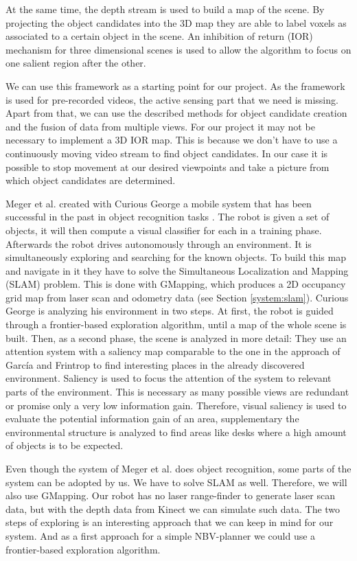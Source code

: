 \documentclass[a4paper,11pt,english]{article}
\begin{document}
At the same time, the depth stream is used to build a map of the scene.
By projecting the object candidates into the 3D map they are able to label voxels as associated to a certain object in the scene.
An inhibition of return (IOR) mechanism for three dimensional scenes is used to allow the algorithm to focus on one salient region after the other.

We can use this framework as a starting point for our project.
As the framework is used for pre-recorded videos, the active sensing part that we need is missing.
Apart from that, we can use the described methods for object candidate creation and the fusion of data from multiple views.
For our project it may not be necessary to implement a 3D IOR map. This is because we don't have to use a continuously moving video stream to find object candidates. In our case it is possible to stop movement at our desired viewpoints and take a picture from which object candidates are determined. \medskip

Meger et al. created with Curious George a mobile system that has been successful in the past in object recognition tasks \cite{meger2010curious}.
The robot is given a set of objects, it will then compute a visual classifier for each in a training phase.
Afterwards the robot drives autonomously through an environment. It is simultaneously exploring and searching for the known objects.
To build this map and navigate in it they have to solve the Simultaneous Localization and Mapping (SLAM) problem.
This is done with GMapping, which produces a 2D occupancy grid map from laser scan and odometry data (see Section \ref{system:slam}).
Curious George is analyzing his environment in two steps.
At first, the robot is guided through a frontier-based exploration algorithm, until a map of the whole scene is built.
Then, as a second phase, the scene is analyzed in more detail:
They use an attention system with a saliency map comparable to the one in the approach of García and Frintrop to find interesting places in the already discovered environment.
Saliency is used to focus the attention of the system to relevant parts of the environment. This is necessary as many possible views are redundant or promise only a very low information gain.
Therefore, visual saliency is used to evaluate the potential information gain of an area, supplementary the environmental structure is analyzed to find areas like desks where a high amount of objects is to be expected.

Even though the system of Meger et al. does object recognition, some parts of the system can be adopted by us.
We have to solve SLAM as well. Therefore, we will also use GMapping. Our robot has no laser range-finder to generate laser scan data, but with the depth data from Kinect we can simulate such data.
The two steps of exploring is an interesting approach that we can keep in mind for our system.
And as a first approach for a simple NBV-planner we could use a frontier-based exploration algorithm. \medskip
\end{document}
